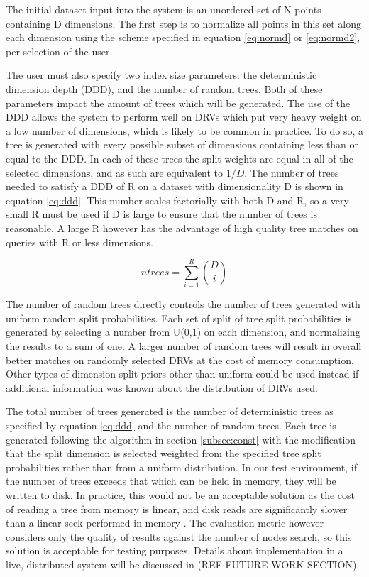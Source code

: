The initial dataset input into the system is an unordered set of N points containing D dimensions.  The first step is to normalize all points in this set along each dimension using the scheme specified in equation \ref{eq:normd} or \ref{eq:normd2}, per selection of the user.

The user must also specify two index size parameters: the deterministic dimension depth (DDD), and the number of random trees.  Both of these parameters impact the amount of trees which will be generated.  The use of the DDD allows the system to perform well on DRVs which put very heavy weight on a low number of dimensions, which is likely to be common in practice.  To do so, a tree is generated with every possible subset of dimensions containing less than or equal to the DDD.  In each of these trees the split weights are equal in all of the selected dimensions, and as such are equivalent to $1/D$.  The number of trees needed to satisfy a DDD of R on a dataset with dimensionality D is shown in equation \ref{eq:ddd}.  This number scales factorially with both D and R, so a very small R must be used if D is large to ensure that the number of trees is reasonable.  A large R however has the advantage of high quality tree matches on queries with R or less dimensions.

\begin{equation}
\label{eq:ddd}
ntrees = \sum\limits_{i=1}^R {D \choose i}
\end{equation}

The number of random trees directly controls the number of trees generated with uniform random split probabilities.  Each set of split of tree split probabilities is generated by selecting a number from U(0,1) on each dimension, and normalizing the results to a sum of one.  A larger number of random trees will result in overall better matches on randomly selected DRVs at the cost of memory consumption.  Other types of dimension split priors other than uniform could be used instead if additional information was known about the distribution of DRVs used.

The total number of trees generated is the number of deterministic trees as specified by equation \ref{eq:ddd} and the number of random trees.  Each tree is generated following the algorithm in section \ref{subsec:const} with the modification that the split dimension is selected weighted from the specified tree split probabilities rather than from a uniform distribution.  In our test environment, if the number of trees exceeds that which can be held in memory, they will be written to disk.  In practice, this would not be an acceptable solution as the cost of reading a tree from memory is linear, and disk reads are significantly slower than a linear seek performed in memory \citep{ousterhout1989beating}.  The evaluation metric however considers only the quality of results against the number of nodes search, so this solution is acceptable for testing purposes.  Details about implementation in a live, distributed system will be discussed in (REF FUTURE WORK SECTION).

